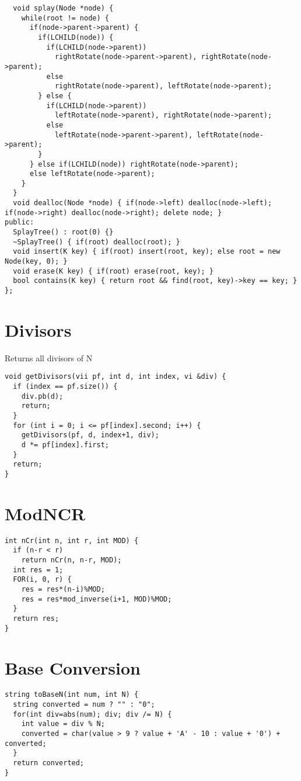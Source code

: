 \documentclass[11pt, oneside]{article}
\begin{document}
\begin{lstlisting}
  void splay(Node *node) {
    while(root != node) {
      if(node->parent->parent) {
        if(LCHILD(node)) {
          if(LCHILD(node->parent))
            rightRotate(node->parent->parent), rightRotate(node->parent);
          else
            rightRotate(node->parent), leftRotate(node->parent);
        } else {
          if(LCHILD(node->parent))
            leftRotate(node->parent), rightRotate(node->parent);
          else
            leftRotate(node->parent->parent), leftRotate(node->parent);
        }
      } else if(LCHILD(node)) rightRotate(node->parent);
      else leftRotate(node->parent);
    }
  }
  void dealloc(Node *node) { if(node->left) dealloc(node->left); if(node->right) dealloc(node->right); delete node; }
public:
  SplayTree() : root(0) {}
  ~SplayTree() { if(root) dealloc(root); }
  void insert(K key) { if(root) insert(root, key); else root = new Node(key, 0); }
  void erase(K key) { if(root) erase(root, key); }
  bool contains(K key) { return root && find(root, key)->key == key; }
};

\end{lstlisting}
\section{Divisors}
Returns all divisors of N
\begin{lstlisting}
void getDivisors(vii pf, int d, int index, vi &div) {
  if (index == pf.size()) {
    div.pb(d);
    return;
  }
  for (int i = 0; i <= pf[index].second; i++) {
    getDivisors(pf, d, index+1, div);
    d *= pf[index].first;
  }
  return;
}

\end{lstlisting}
\section{ModNCR}
\begin{lstlisting}
int nCr(int n, int r, int MOD) {
  if (n-r < r)
    return nCr(n, n-r, MOD);
  int res = 1;
  FOR(i, 0, r) {
    res = res*(n-i)%MOD;
    res = res*mod_inverse(i+1, MOD)%MOD;
  }
  return res;
}

\end{lstlisting}
\section{Base Conversion}
\begin{lstlisting}
string toBaseN(int num, int N) {
  string converted = num ? "" : "0";
  for(int div=abs(num); div; div /= N) {
    int value = div % N;
    converted = char(value > 9 ? value + 'A' - 10 : value + '0') + converted;
  }
  return converted;
}

\end{lstlisting}
\end{document}

